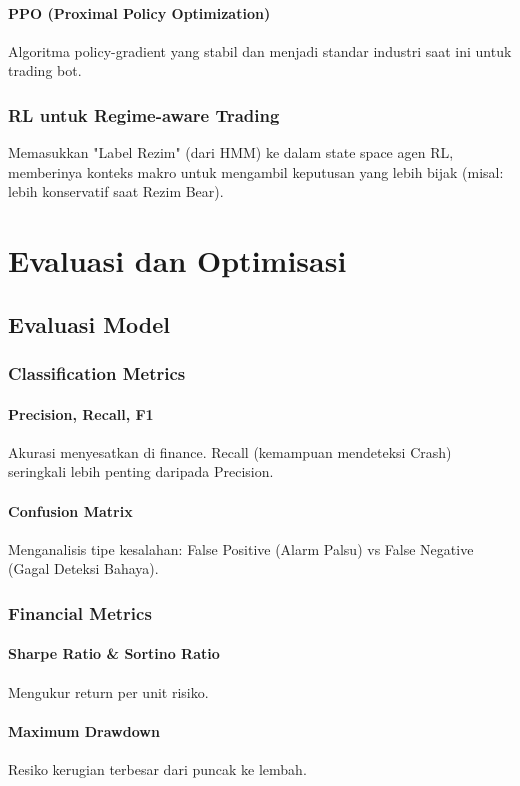 \documentclass[12pt,a4paper]{book}
\begin{document}
\subsection{PPO (Proximal Policy Optimization)}
Algoritma policy-gradient yang stabil dan menjadi standar industri saat ini untuk trading bot.

\section{RL untuk Regime-aware Trading}
Memasukkan "Label Rezim" (dari HMM) ke dalam state space agen RL, memberinya konteks makro untuk mengambil keputusan yang lebih bijak (misal: lebih konservatif saat Rezim Bear).

\part{Evaluasi dan Optimisasi}

\chapter{Evaluasi Model}
\section{Classification Metrics}
\subsection{Precision, Recall, F1}
Akurasi menyesatkan di finance. Recall (kemampuan mendeteksi Crash) seringkali lebih penting daripada Precision.
\subsection{Confusion Matrix}
Menganalisis tipe kesalahan: False Positive (Alarm Palsu) vs False Negative (Gagal Deteksi Bahaya).

\section{Financial Metrics}
\subsection{Sharpe Ratio & Sortino Ratio}
Mengukur return per unit risiko.
\subsection{Maximum Drawdown}
Resiko kerugian terbesar dari puncak ke lembah.
\end{document}

